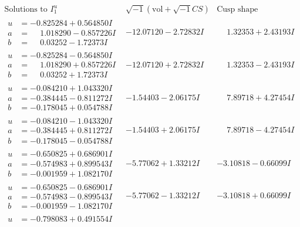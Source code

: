 \documentclass[1p]{elsarticle_modified}
\theoremstyle{definition}
\newcommand{\I}{\sqrt{-1}}
\begin{document}
$$\begin{array}{c|c|c}  
\text{Solutions to }I^u_{1}& \I (\text{vol} + \sqrt{-1}CS) & \text{Cusp shape}\\
 \hline 
\begin{aligned}
u &= -0.825284 + 0.564850 I \\
a &= \phantom{-}1.018290 - 0.857226 I \\
b &= \phantom{-}0.03252 - 1.72373 I\end{aligned}
 & -12.07120 - 2.72832 I & \phantom{-}1.32353 + 2.43193 I \\ \hline\begin{aligned}
u &= -0.825284 - 0.564850 I \\
a &= \phantom{-}1.018290 + 0.857226 I \\
b &= \phantom{-}0.03252 + 1.72373 I\end{aligned}
 & -12.07120 + 2.72832 I & \phantom{-}1.32353 - 2.43193 I \\ \hline\begin{aligned}
u &= -0.084210 + 1.043320 I \\
a &= -0.384445 - 0.811272 I \\
b &= -0.178045 + 0.054788 I\end{aligned}
 & -1.54403 - 2.06175 I & \phantom{-}7.89718 + 4.27454 I \\ \hline\begin{aligned}
u &= -0.084210 - 1.043320 I \\
a &= -0.384445 + 0.811272 I \\
b &= -0.178045 - 0.054788 I\end{aligned}
 & -1.54403 + 2.06175 I & \phantom{-}7.89718 - 4.27454 I \\ \hline\begin{aligned}
u &= -0.650825 + 0.686901 I \\
a &= -0.574983 + 0.899543 I \\
b &= -0.001959 + 1.082170 I\end{aligned}
 & -5.77062 + 1.33212 I & -3.10818 - 0.66099 I \\ \hline\begin{aligned}
u &= -0.650825 - 0.686901 I \\
a &= -0.574983 - 0.899543 I \\
b &= -0.001959 - 1.082170 I\end{aligned}
 & -5.77062 - 1.33212 I & -3.10818 + 0.66099 I \\ \hline\begin{aligned}
u &= -0.798083 + 0.491554 I \\

\end{aligned}
\end{array}$$
\end{document}
